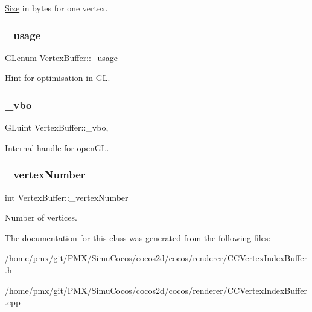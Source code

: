\hyperlink{classSize}{Size} in bytes for one vertex. \mbox{\label{classVertexBuffer_afc2e5896bd99325f5da9203a9d9437a5}} 
\subsubsection{\texorpdfstring{\+\_\+usage}{\_usage}}
{\footnotesize\ttfamily G\+Lenum Vertex\+Buffer\+::\+\_\+usage\hspace{0.3cm}{\ttfamily [protected]}}

Hint for optimisation in GL. \mbox{\label{classVertexBuffer_a7dcce3c5252f7cee70fa64020579f5a0}} 
\subsubsection{\texorpdfstring{\+\_\+vbo}{\_vbo}}
{\footnotesize\ttfamily G\+Luint Vertex\+Buffer\+::\+\_\+vbo\hspace{0.3cm}{\ttfamily [mutable]}, {\ttfamily [protected]}}

Internal handle for open\+GL. \mbox{\label{classVertexBuffer_a1893c2dafea7923f7e5a508154ffd597}} 
\subsubsection{\texorpdfstring{\+\_\+vertex\+Number}{\_vertexNumber}}
{\footnotesize\ttfamily int Vertex\+Buffer\+::\+\_\+vertex\+Number\hspace{0.3cm}{\ttfamily [protected]}}

Number of vertices. 

The documentation for this class was generated from the following files\+:\begin{DoxyCompactItemize}
\item 
/home/pmx/git/\+P\+M\+X/\+Simu\+Cocos/cocos2d/cocos/renderer/C\+C\+Vertex\+Index\+Buffer.\+h\item 
/home/pmx/git/\+P\+M\+X/\+Simu\+Cocos/cocos2d/cocos/renderer/C\+C\+Vertex\+Index\+Buffer.\+cpp\end{DoxyCompactItemize}

